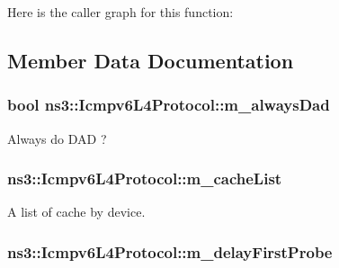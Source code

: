 Here is the caller graph for this function\+:




\subsection{Member Data Documentation}
\subsubsection[{\texorpdfstring{m\+\_\+always\+Dad}{m_alwaysDad}}]{\setlength{\rightskip}{0pt plus 5cm}bool ns3\+::\+Icmpv6\+L4\+Protocol\+::m\+\_\+always\+Dad\hspace{0.3cm}{\ttfamily [private]}}\hypertarget{classns3_1_1Icmpv6L4Protocol_aa21acf24e3acd05c073c0b15d94b6759}{}\label{classns3_1_1Icmpv6L4Protocol_aa21acf24e3acd05c073c0b15d94b6759}


Always do D\+AD ? 

\subsubsection[{\texorpdfstring{m\+\_\+cache\+List}{m_cacheList}}]{ ns3\+::\+Icmpv6\+L4\+Protocol\+::m\+\_\+cache\+List\hspace{0.3cm}{\ttfamily [private]}}\hypertarget{classns3_1_1Icmpv6L4Protocol_af48a7cf3be7bc3d413c9302b10314244}{}\label{classns3_1_1Icmpv6L4Protocol_af48a7cf3be7bc3d413c9302b10314244}


A list of cache by device. 

\subsubsection[{\texorpdfstring{m\+\_\+delay\+First\+Probe}{m_delayFirstProbe}}]{ ns3\+::\+Icmpv6\+L4\+Protocol\+::m\+\_\+delay\+First\+Probe\hspace{0.3cm}{\ttfamily [private]}}\hypertarget{classns3_1_1Icmpv6L4Protocol_acaf08c9a0615db56d8b0a2632abef51a}{}\label{classns3_1_1Icmpv6L4Protocol_acaf08c9a0615db56d8b0a2632abef51a}


